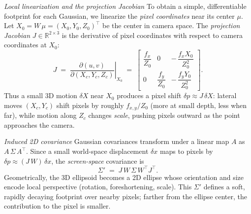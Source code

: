 \begin{enrichment}
\begin{enrichment}
\begin{enrichment}
        \noindent\textit{Local linearization and the projection Jacobian}
        To obtain a simple, differentiable footprint for each Gaussian, we linearize the \emph{pixel coordinates} near its center $\mu$. 
        Let $X_0=W\,\mu=(X_0,Y_0,Z_0)^{\top}$ be the center in camera space. 
        The \emph{projection Jacobian} $J\in\mathbb{R}^{2\times3}$ is the derivative of pixel coordinates with respect to camera coordinates at $X_0$:
        \[
        J \;=\; 
        \left.\frac{\partial(u,v)}{\partial(X_c,Y_c,Z_c)}\right|_{X_0}
        \;=\;
        \begin{bmatrix}
            \dfrac{f_x}{Z_0} & 0 & -\,\dfrac{f_x X_0}{Z_0^2}\\[10pt]
            0 & \dfrac{f_y}{Z_0} & -\,\dfrac{f_y Y_0}{Z_0^2}
        \end{bmatrix}.
        \]
        Thus a small 3D motion $\delta X$ near $X_0$ produces a pixel shift $\delta p\approx J\,\delta X$: lateral moves $(X_c,Y_c)$ shift pixels by roughly $f_{x,y}/Z_0$ (more at small depth, less when far), while motion along $Z_c$ changes \emph{scale}, pushing pixels outward as the point approaches the camera.
        
        \medskip
        
        \noindent\textit{Induced 2D covariance}
        Gaussian covariances transform under a linear map $A$ as $A\,\Sigma\,A^{\top}$. 
        Since a small world-space displacement $\delta x$ maps to pixels by $\delta p\approx (J\,W)\,\delta x$, the \emph{screen-space} covariance is
        \[
        \Sigma' \;=\; J\,W\,\Sigma\,W^{\top}J^{\top}.
        \]
        Geometrically, the 3D ellipsoid becomes a 2D ellipse whose orientation and size encode local perspective (rotation, foreshortening, scale). 
        This $\Sigma'$ defines a soft, rapidly decaying footprint over nearby pixels; farther from the ellipse center, the contribution to the pixel is smaller.
        

\end{enrichment}
\end{enrichment}
\end{enrichment}
